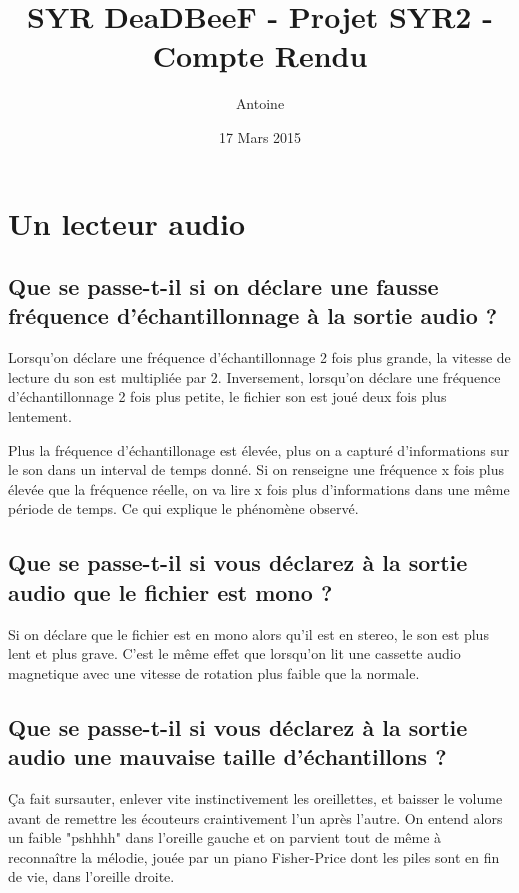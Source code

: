 \documentclass[a4paper,10pt,openany,oneside]{report}
\title{SYR DeaDBeeF - Projet SYR2 - Compte Rendu}
\author{Antoine \bsc{Pinsard}}
\date{17 Mars 2015}
\begin{document}
\maketitle

\section{Un lecteur audio}

\subsection{Que se passe-t-il si on déclare une fausse fréquence
            d'échantillonnage à la sortie audio ?}

Lorsqu'on déclare une fréquence d'échantillonnage 2 fois plus grande, la
vitesse de lecture du son est multipliée par 2. Inversement, lorsqu'on déclare
une fréquence d'échantillonnage 2 fois plus petite, le fichier son est joué
deux fois plus lentement.

Plus la fréquence d'échantillonage est élevée, plus on a capturé d'informations
sur le son dans un interval de temps donné. Si on renseigne une fréquence x
fois plus élevée que la fréquence réelle, on va lire x fois plus d'informations
dans une même période de temps. Ce qui explique le phénomène observé.

\subsection{Que se passe-t-il si vous déclarez à la sortie audio que le fichier
            est mono ?}

Si on déclare que le fichier est en mono alors qu'il est en stereo, le son est
plus lent et plus grave. C'est le même effet que lorsqu'on lit une cassette
audio magnetique avec une vitesse de rotation plus faible que la normale.

\subsection{Que se passe-t-il si vous déclarez à la sortie audio une mauvaise
            taille d'échantillons ?}

Ça fait sursauter, enlever vite instinctivement les oreillettes, et baisser le
volume avant de remettre les écouteurs craintivement l'un après l'autre. On
entend alors un faible "pshhhh" dans l'oreille gauche et on parvient tout de
même à reconnaître la mélodie, jouée par un piano Fisher-Price dont les piles
sont en fin de vie, dans l'oreille droite.
\end{document}
